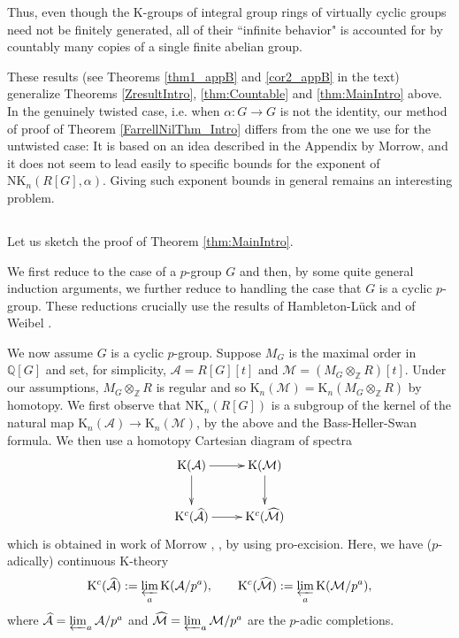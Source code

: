 \documentclass[reqno,11pt,letterpaper]{amsart}
\theoremstyle{plain}
\numberwithin{equation}{subsection}
\theoremstyle{remark}
\theoremstyle{plain}
\theoremstyle{definition}\newtheorem*{notation}{Notation}
\newcommand{\A}{{\mathcal A}}
\newcommand{\Q}{{\mathbb Q}}
\newcommand{\M}{{\mathcal M}}
\newcommand{\RK}{\mathrm{K}}
\newcommand{\RNK}{\mathrm{NK}}
\newcommand{\NK}{\mathrm{NK}}
\newcommand{\BZ}{\mathbb{Z}}
\newcommand{\prolim}{\varprojlim}
\newcommand{\wh}{\widehat}
\begin{document}
Thus, even though the $\RK$-groups of integral group rings of  virtually cyclic groups need
not be finitely generated, all of their ``infinite behavior" is accounted for by countably
many copies of a single finite abelian group.

These  results (see Theorems \ref{thm1_appB} and \ref{cor2_appB} in the text) generalize Theorems \ref{ZresultIntro}, \ref{thm:Countable} and \ref{thm:MainIntro} above. In the genuinely twisted case, i.e. when $\alpha:G\to G$ is not the identity, our method of proof of Theorem \ref{FarrellNilThm_Intro} differs from the one we use for the untwisted case: It is based on an idea described in the Appendix by Morrow, and it does not seem to lead easily to specific bounds for the exponent of $\NK_n(R[G],\alpha)$. Giving such  exponent bounds in general remains an interesting problem.

 

 
 
 
\subsection{}   Let us  sketch the proof of Theorem \ref{thm:MainIntro}.

We first reduce to the case of a $p$-group $G$ and then, by some  quite general induction arguments, we further reduce to handling the case that $G$ is a cyclic $p$-group. These reductions crucially use the results of Hambleton-L\"uck \cite{HLuck} and of Weibel \cite{WMV}.  

We now assume $G$ is a cyclic $p$-group. Suppose $M_G$ is the maximal order in $\Q[G]$ and set, for simplicity, $\A=R[G][t]$ and $\M=(M_G\otimes_\BZ R)[t]$.
Under our assumptions, $M_G\otimes_\BZ R$ is regular and so $\RK_n(\M)=\RK_n(M_G\otimes_\BZ R)$ by homotopy. We first observe that 
  $\RNK_n(R[G])$ is a subgroup of the kernel  of the natural map $\RK_n(\A)\to \RK_n(\M)$, by the above and the Bass-Heller-Swan formula.
We then use a  homotopy Cartesian diagram of  spectra
 \begin{equation}\label{CDintro}
\begin{aligned}
\xymatrix{
\RK(\A) \ar[r]\ar[d] & \RK(\M) \ar[d]\\
\RK^c(\wh \A)\ar[r] &\RK^c(\wh \M)\\
}
\end{aligned}
\end{equation}
which is obtained in work of Morrow \cite{Morrowpro}, \cite{Morrowpro2}, by using pro-excision.   
Here, we have ($p$-adically) continuous $\RK$-theory
\[
\RK^c(\wh \A):=\prolim_a \RK(\A/p^a),\qquad  \RK^c(\wh \M):=\prolim_a \RK( \M/p^a),
\]
where $\wh \A=\prolim_a  \A/p^a$ and $\wh \M=\prolim_a   \M/p^a$ are the $p$-adic completions. 
\end{document}
